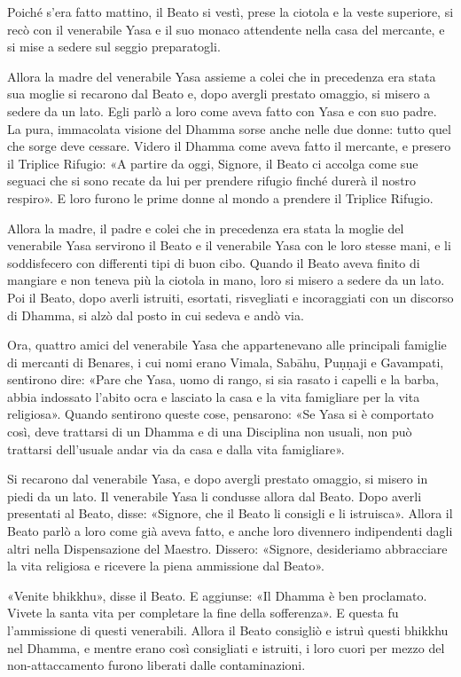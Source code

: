 Poiché s’era fatto mattino, il Beato si vestì, prese la ciotola e la
veste superiore, si recò con il venerabile Yasa e il suo monaco
attendente nella casa del mercante, e si mise a sedere sul seggio
preparatogli.


Allora la madre del venerabile Yasa assieme a colei che in precedenza
era stata sua moglie si recarono dal Beato e, dopo avergli prestato
omaggio, si misero a sedere da un lato. Egli parlò a loro come aveva
fatto con Yasa e con suo padre. La pura, immacolata visione del Dhamma
sorse anche nelle due donne: tutto quel che sorge deve cessare. Videro
il Dhamma come aveva fatto il mercante, e presero il Triplice Rifugio:
«A partire da oggi, Signore, il Beato ci accolga come sue seguaci che si
sono recate da lui per prendere rifugio finché durerà il nostro
respiro». E loro furono le prime donne al mondo a prendere il Triplice
Rifugio.


Allora la madre, il padre e colei che in precedenza era stata la moglie
del venerabile Yasa servirono il Beato e il venerabile Yasa con le loro
stesse mani, e li soddisfecero con differenti tipi di buon cibo. Quando
il Beato aveva finito di mangiare e non teneva più la ciotola in mano,
loro si misero a sedere da un lato. Poi il Beato, dopo averli istruiti,
esortati, risvegliati e incoraggiati con un discorso di Dhamma, si alzò
dal posto in cui sedeva e andò via.


Ora, quattro amici del venerabile Yasa che appartenevano alle principali
famiglie di mercanti di Benares, i cui nomi erano Vimala, Sabāhu,
Puṇṇaji e Gavampati, sentirono dire: «Pare che Yasa, uomo di rango, si
sia rasato i capelli e la barba, abbia indossato l’abito ocra e lasciato
la casa e la vita famigliare per la vita religiosa». Quando sentirono
queste cose, pensarono: «Se Yasa si è comportato così, deve trattarsi di
un Dhamma e di una Disciplina non usuali, non può trattarsi dell’usuale
andar via da casa e dalla vita famigliare».


Si recarono dal venerabile Yasa, e dopo avergli prestato omaggio, si
misero in piedi da un lato. Il venerabile Yasa li condusse allora dal
Beato. Dopo averli presentati al Beato, disse: «Signore, che il Beato li
consigli e li istruisca». Allora il Beato parlò a loro come già aveva
fatto, e anche loro divennero indipendenti dagli altri nella
Dispensazione del Maestro. Dissero: «Signore, desideriamo abbracciare la
vita religiosa e ricevere la piena ammissione dal Beato».


«Venite bhikkhu», disse il Beato. E aggiunse: «Il Dhamma è ben
proclamato. Vivete la santa vita per completare la fine della
sofferenza». E questa fu l’ammissione di questi venerabili. Allora il
Beato consigliò e istruì questi bhikkhu nel Dhamma, e mentre erano così
consigliati e istruiti, i loro cuori per mezzo del non-attaccamento
furono liberati dalle contaminazioni.


